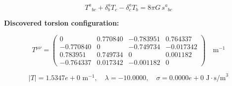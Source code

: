 
\begin{equation}
  T^a{}_{bc} + \delta^a_b T_c - \delta^a_c T_b = 8\pi G \, s^a{}_{bc}
\end{equation}

\textbf{Discovered torsion configuration:}

\begin{equation}
  T^{\mu\nu} = \begin{pmatrix}
    0 & 0.770840 & -0.783951 & 0.764337 \\
    -0.770840 & 0 & -0.749734 & -0.017342 \\
    0.783951 & 0.749734 & 0 & 0.001182 \\
    -0.764337 & 0.017342 & -0.001182 & 0
  \end{pmatrix} \quad \text{m}^{-1}
\end{equation}

\begin{equation}
  |T| = 1.5347e+0 \text{ m}^{-1}, \quad
  \lambda = -10.0000, \quad
  \sigma = 0.0000e+0 \text{ J}\cdot\text{s/m}^3
\end{equation}
